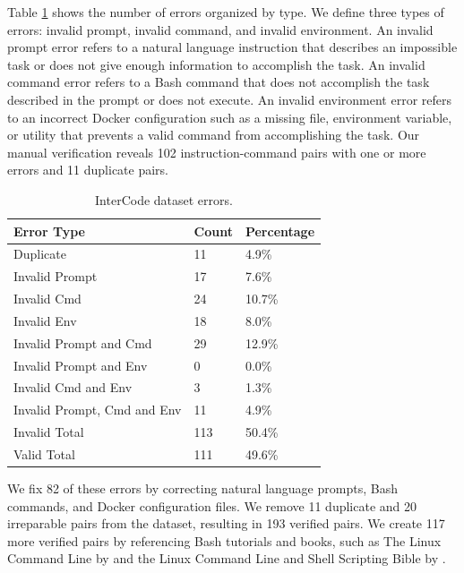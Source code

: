 \documentclass[11pt]{article}
\begin{document}
Table \ref{tab:errors} shows the number of errors organized by type. We define three types of errors: invalid prompt, invalid command, and invalid environment. An invalid prompt error refers to a natural language instruction that describes an impossible task or does not give enough information to accomplish the task. An invalid command error refers to a Bash command that does not accomplish the task described in the prompt or does not execute. An invalid environment error refers to an incorrect Docker configuration such as a missing file, environment variable, or utility that prevents a valid command from accomplishing the task. Our manual verification reveals 102 instruction-command pairs with one or more errors and 11 duplicate pairs.

\begin{table}[ht!]
  \centering
  \scriptsize
  \caption{InterCode dataset errors.}
  \begin{tabular}{lll}
    \hline
    \textbf{Error Type}         & \textbf{Count} & \textbf{Percentage} \\
    \hline
    Duplicate                   & 11             & 4.9\%               \\
    Invalid Prompt              & 17             & 7.6\%               \\
    Invalid Cmd                 & 24             & 10.7\%              \\
    Invalid Env                 & 18             & 8.0\%               \\
    Invalid Prompt and Cmd      & 29             & 12.9\%              \\
    Invalid Prompt and Env      & 0              & 0.0\%               \\
    Invalid Cmd and Env         & 3              & 1.3\%               \\
    Invalid Prompt, Cmd and Env & 11             & 4.9\%               \\
    \hline
    Invalid Total               & 113            & 50.4\%              \\
    Valid Total                 & 111            & 49.6\%              \\
    \hline
  \end{tabular}
  \label{tab:errors}
\end{table}

We fix 82 of these errors by correcting natural language prompts, Bash commands, and Docker configuration files. We remove 11 duplicate and 20 irreparable pairs from the dataset, resulting in 193 verified pairs. We create 117 more verified pairs by referencing Bash tutorials and books, such as The Linux Command Line by \citet{linux_cli_book} and the Linux Command Line and Shell Scripting Bible by \citet{linux_bible}.
\end{document}
